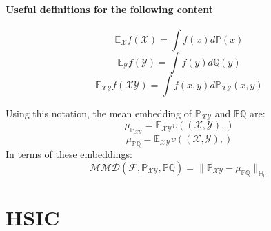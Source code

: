\documentclass[8pt,a4paper]{article}
\providecommand{\norm}[1]{\lVert#1\rVert}
\begin{document}
\paragraph{Useful definitions for the following content}
$$\mathbb{E}_{\mathcal{X}}f(\mathcal{X}) = \int f(x)d\mathbb{P}(x)$$
$$\mathbb{E}_{\mathcal{Y}}f(\mathcal{Y}) = \int f(y)d\mathbb{Q}(y)$$
$$\mathbb{E}_{\mathcal{X}\mathcal{Y}}f(\mathcal{X}\mathcal{Y}) = \int f(x,y)d\mathbb{P}_{\mathcal{X}\mathcal{Y}}(x,y)$$

Using this notation, the mean embedding of $\mathbb{P}_{\mathcal{X}\mathcal{Y}}$ and $\mathbb{P}\mathbb{Q}$ are:
$$\mu_{\mathbb{P}_{\mathcal{X}\mathcal{Y}}} = \mathbb{E}_{\mathcal{X}\mathcal{Y}}\upsilon((\mathcal{X},\mathcal{Y}),)$$
$$\mu_{\mathbb{P}\mathbb{Q}} = \mathbb{E}_{\mathcal{X}\mathcal{Y}}\upsilon((\mathcal{X},\mathcal{Y}),)$$
In terms of these embeddings:
$$\mathcal{MMD}(\mathcal{F}, \mathbb{P}_{\mathcal{XY}},\mathbb{P}\mathbb{Q}) = \norm{\mathbb{P}_{\mathcal{X}\mathcal{Y}}-\mu_{\mathbb{P}\mathbb{Q}} }_{\mathbb{H}_{\upsilon}}$$

\section{HSIC}
\end{document}
